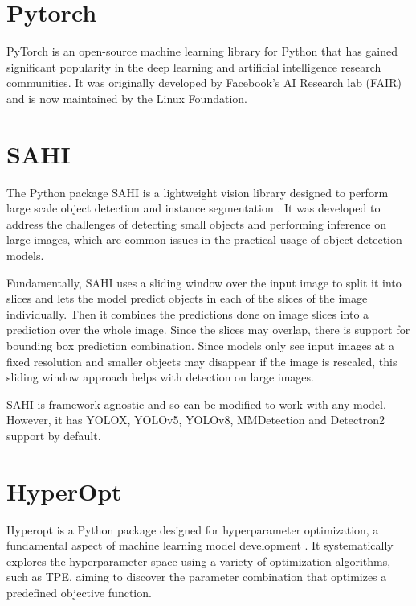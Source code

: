 \documentclass[10pt]{book}
\begin{document}
\section{Pytorch}

PyTorch is an open-source machine learning library for Python that has gained significant popularity in the deep learning and artificial intelligence research communities. It was originally developed by Facebook's AI Research lab (FAIR) and is now maintained by the Linux Foundation. %

\section{SAHI}

The Python package \ac{SAHI} is a lightweight vision library designed to perform large scale object detection and instance segmentation \cite{akyon2022sahi,obss2021sahi}. It was developed to address the challenges of detecting small objects and performing inference on large images, which are common issues in the practical usage of object detection models. 

Fundamentally, \ac{SAHI} uses a sliding window over the input image to split it into slices and lets the model predict objects in each of the slices of the image individually. Then it combines the predictions done on image slices into a prediction over the whole image. Since the slices may overlap, there is support for bounding box prediction combination. Since models only see input images at a fixed resolution and smaller objects may disappear if the image is rescaled, this sliding window approach helps with detection on large images. 

\ac{SAHI} is framework agnostic and so can be modified to work with any model. However, it has \ac{YOLO}X, \ac{YOLO}v5, \ac{YOLO}v8, MMDetection and Detectron2 support by default.

\section{HyperOpt}

Hyperopt is a Python package designed for hyperparameter optimization, a fundamental aspect of machine learning model development \cite{bergstra2013making}. It systematically explores the hyperparameter space using a variety of optimization algorithms, such as \ac{TPE}, aiming to discover the parameter combination that optimizes a predefined objective function. 
\end{document}

